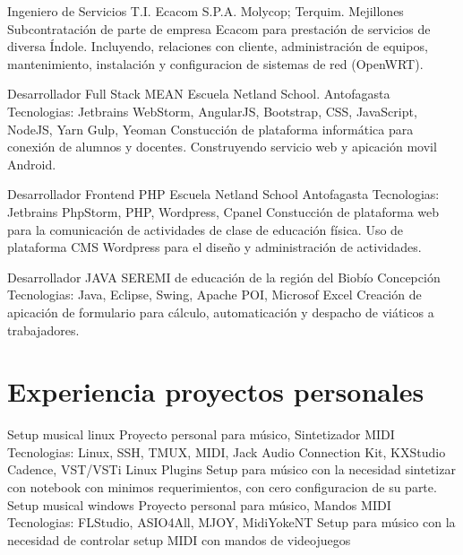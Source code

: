 \documentclass[draft,color,12pt,letterpaper,sans]{moderncv}
\begin{document}
{Ingeniero de Servicios T.I.}
{Ecacom S.P.A.}
{Molycop; Terquim. Mejillones}
{}
{Subcontrataci\'on de parte de empresa Ecacom para prestaci\'on de servicios de diversa \'Indole. Incluyendo, relaciones con cliente, administraci\'on de equipos, mantenimiento, instalaci\'on y configuracion de sistemas de red (OpenWRT).\newline}

{Desarrollador Full Stack MEAN}
{Escuela Netland School.}
{Antofagasta}
{\newline Tecnologias: Jetbrains WebStorm, AngularJS, Bootstrap, CSS, JavaScript, NodeJS, Yarn Gulp, Yeoman }
{Constucci\'on de plataforma inform\'atica para conexi\'on de alumnos y docentes. Construyendo servicio web y apicaci\'on movil Android.\newline}

{Desarrollador Frontend PHP}
{Escuela Netland School}
{Antofagasta}
{\newline Tecnologias: Jetbrains PhpStorm, PHP, Wordpress, Cpanel}
{Constucci\'on de plataforma web para la comunicaci\'on de actividades de clase de educaci\'on f\'isica. Uso de plataforma CMS Wordpress para el dise\~no y administraci\'on de actividades.\newline}

{Desarrollador JAVA}
{SEREMI de educación de la región del Biobío}
{Concepci\'on}
{\newline Tecnologias: Java, Eclipse, Swing, Apache POI, Microsof Excel}
{Creaci\'on de apicaci\'on de formulario para c\'alculo, automaticaci\'on y despacho de vi\'aticos a trabajadores.\newline}


\section{Experiencia proyectos personales}

\cventry {}
{Setup musical linux}
{Proyecto personal para m\'usico, Sintetizador MIDI}
{}
{\newline Tecnologias: Linux, SSH, TMUX, MIDI, Jack Audio Connection Kit, KXStudio Cadence, VST/VSTi Linux Plugins}
{Setup para m\'usico con la necesidad sintetizar con notebook con minimos requerimientos, con cero configuracion de su parte.\newline}
\cventry {}
{Setup musical windows}
{Proyecto personal para m\'usico, Mandos MIDI}
{}
{\newline Tecnologias: FLStudio, ASIO4All, MJOY, MidiYokeNT}
{Setup para m\'usico con la necesidad de controlar setup MIDI con mandos de videojuegos\newline}
\end{document}
